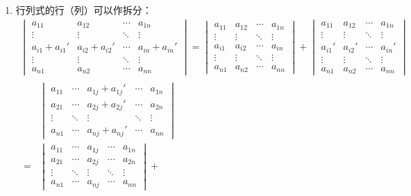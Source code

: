 \begin{property}
\begin{enumerate}
		\item 行列式的行（列）可以作拆分：
		\begin{gather*}
			\begin{vmatrix}
				a_{11} & a_{12} & \cdots & a_{1n} \\
				\vdots & \vdots & \ddots & \vdots \\
				a_{i1}+a_{i1}' & a_{i2}+a_{i2}' & \cdots & a_{in}+a_{in}' \\
				\vdots & \vdots & \ddots & \vdots \\
				a_{n1} & a_{n2} & \cdots & a_{nn}
			\end{vmatrix}=
			\begin{vmatrix}
				a_{11} & a_{12} & \cdots & a_{1n} \\
				\vdots & \vdots & \ddots & \vdots \\
				a_{i1} & a_{i2} & \cdots & a_{in} \\
				\vdots & \vdots & \ddots & \vdots \\
				a_{n1} & a_{n2} & \cdots & a_{nn}
			\end{vmatrix}+
			\begin{vmatrix}
				a_{11} & a_{12} & \cdots & a_{1n} \\
				\vdots & \vdots & \ddots & \vdots \\
				a_{i1}' & a_{i2}' & \cdots & a_{in}' \\
				\vdots & \vdots & \ddots & \vdots \\
				a_{n1} & a_{n2} & \cdots & a_{nn}
			\end{vmatrix} \\
			\begin{aligned}
				&\begin{vmatrix}
					a_{11} & \cdots & a_{1j}+a_{1j}' & \cdots & a_{1n} \\
					a_{21} & \cdots & a_{2j}+a_{2j}' & \cdots & a_{2n} \\
					\vdots & \ddots & \vdots & \ddots & \vdots \\
					a_{n1} & \cdots & a_{nj}+a_{nj}' & \cdots & a_{nn}
				\end{vmatrix} \\
				=&
				\begin{vmatrix}
					a_{11} & \cdots & a_{1j} & \cdots & a_{1n} \\
					a_{21} & \cdots & a_{2j} & \cdots & a_{2n} \\
					\vdots & \ddots & \vdots & \ddots & \vdots \\
					a_{n1} & \cdots & a_{nj} & \cdots & a_{nn}
				\end{vmatrix}+

\end{aligned}
\end{gather*}
\end{enumerate}
\end{property}
